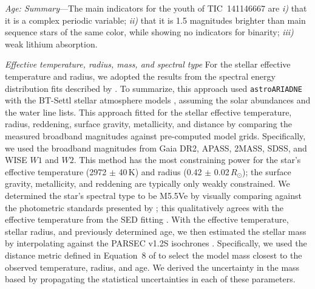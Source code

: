 \documentclass{nature3}
\begin{document}
\begin{methods}
{\it Age: Summary}---The main indicators for the youth of
TIC~141146667 are {\it i)} that it is a complex periodic variable;
{\it ii)} that it is 1.5 magnitudes brighter than main sequence stars
of the same color, while showing no indicators for binarity; {\it
iii)} weak lithium absorption.





{\it Effective temperature, radius, mass, and spectral type}
For the stellar effective temperature and radius, we adopted the results
from the spectral energy distribution fits described by
\cite{Bouma2024}.  To summarize, this approach used
\texttt{astroARIADNE} \cite{Vines2022} with the BT-Settl stellar
atmosphere models \cite{Allard2012}, assuming the \cite{Asplund2009}
solar abundances and the \cite{Barber2006} water line lists.  This
approach fitted for the stellar effective temperature, radius,
reddening, surface gravity, metallicity, and distance by comparing the
measured broadband magnitudes against pre-computed model grids.
Specifically, we used the broadband magnitudes from Gaia DR2, APASS,
2MASS, SDSS, and WISE $W1$ and $W2$.  This method has the most
constraining power for the star's effective temperature (2972 $\pm$
40\,K) and radius (0.42 $\pm$ 0.02\,$R_\odot$); the surface gravity,
metallicity, and reddening are typically only weakly constrained.  We
determined the star's spectral type to be M5.5Ve by visually comparing
against the photometric standards presented by \cite{Bochanski2007};
this qualitatively agrees with the effective temperature from the SED
fitting \cite{Pecaut2013}.  With the effective temperature, stellar
radius, and previously determined age, we then estimated the stellar
mass by interpolating against the PARSEC v1.2S isochrones
\cite{Chen2014}.  Specifically, we used the distance metric defined in
Equation~8 of \cite{Bouma2024} to select the model mass closest to the
observed temperature, radius, and age.  We derived the uncertainty in
the mass based by propagating the statistical uncertainties in each of
these parameters.



\end{methods}
\end{document}
